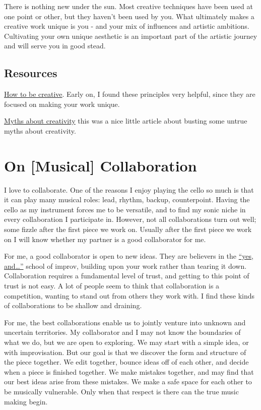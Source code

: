 \documentclass[
]{book}
\begin{document}
There is nothing new under the sun. Most creative techniques have been used at one point or other, but they haven't been used by you. What ultimately makes a creative work unique is you - and your mix of influences and artistic ambitions. Cultivating your own unique aesthetic is an important part of the artistic journey and will serve you in good stead.

\hypertarget{resources-4}{%
\section{Resources}\label{resources-4}}

\href{http://gapingvoid.com/2004/10/18/how-to-be-creative-in-pdf-format/}{How to be creative}. Early on, I found these principles very helpful, since they are focused on making your work unique.

\href{http://lifehacker.com/demystifying-the-muse-five-creativity-myths-you-should-1688503554}{Myths about creativity} this was a nice little article about busting some untrue myths about creativity.

\hypertarget{on-musical-collaboration}{%
\chapter{On {[}Musical{]} Collaboration}\label{on-musical-collaboration}}

I love to collaborate. One of the reasons I enjoy playing the cello so much is that it can play many musical roles: lead, rhythm, backup, counterpoint. Having the cello as my instrument forces me to be versatile, and to find my sonic niche in every collaboration I participate in. However, not all collaborations turn out well; some fizzle after the first piece we work on. Usually after the first piece we work on I will know whether my partner is a good collaborator for me.

For me, a good collaborator is open to new ideas. They are believers in the \href{https://en.m.wikipedia.org/wiki/\%22Yes,_And\%22_rule}{``yes, and\ldots{}''} school of improv, building upon your work rather than tearing it down. Collaboration requires a fundamental level of trust, and getting to this point of trust is not easy. A lot of people seem to think that collaboration is a competition, wanting to stand out from others they work with. I find these kinds of collaborations to be shallow and draining.

For me, the best collaborations enable us to jointly venture into unknown and uncertain territories. My collaborator and I may not know the boundaries of what we do, but we are open to exploring. We may start with a simple idea, or with improvisation. But our goal is that we discover the form and structure of the piece together. We edit together, bounce ideas off of each other, and decide when a piece is finished together. We make mistakes together, and may find that our best ideas arise from these mistakes. We make a safe space for each other to be musically vulnerable. Only when that respect is there can the true music making begin.
\end{document}
